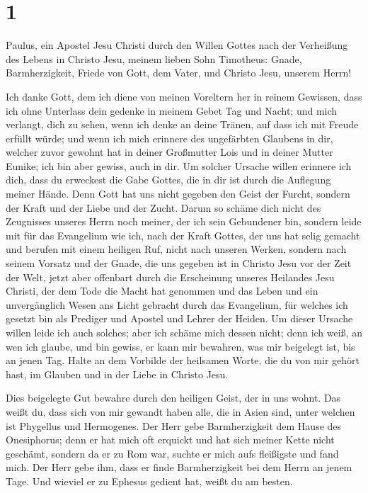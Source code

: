 \hypertarget{section}{%
\section{1}\label{section}}

 Paulus, ein Apostel Jesu Christi durch den Willen Gottes
nach der Verheißung des Lebens in Christo Jesu,  meinem
lieben Sohn Timotheus: Gnade, Barmherzigkeit, Friede von Gott, dem
Vater, und Christo Jesu, unserem Herrn!

 Ich danke Gott, dem ich diene von meinen Voreltern her in
reinem Gewissen, dass ich ohne Unterlass dein gedenke in meinem Gebet
Tag und Nacht;  und mich verlangt, dich zu sehen, wenn ich
denke an deine Tränen, auf dass ich mit Freude erfüllt würde;
 und wenn ich mich erinnere des ungefärbten Glaubens in
dir, welcher zuvor gewohnt hat in deiner Großmutter Lois und in deiner
Mutter Eunike; ich bin aber gewiss, auch in dir.  Um
solcher Ursache willen erinnere ich dich, dass du erweckest die Gabe
Gottes, die in dir ist durch die Auflegung meiner Hände. 
Denn Gott hat uns nicht gegeben den Geist der Furcht, sondern der Kraft
und der Liebe und der Zucht.  Darum so schäme dich nicht
des Zeugnisses unseres Herrn noch meiner, der ich sein Gebundener bin,
sondern leide mit für das Evangelium wie ich, nach der Kraft Gottes,
 der uns hat selig gemacht und berufen mit einem heiligen
Ruf, nicht nach unseren Werken, sondern nach seinem Vorsatz und der
Gnade, die uns gegeben ist in Christo Jesu vor der Zeit der Welt,
 jetzt aber offenbart durch die Erscheinung unseres
Heilandes Jesu Christi, der dem Tode die Macht hat genommen und das
Leben und ein unvergänglich Wesen ans Licht gebracht durch das
Evangelium,  für welches ich gesetzt bin als Prediger und
Apostel und Lehrer der Heiden.  Um dieser Ursache willen
leide ich auch solches; aber ich schäme mich dessen nicht; denn ich
weiß, an wen ich glaube, und bin gewiss, er kann mir bewahren, was mir
beigelegt ist, bis an jenen Tag.  Halte an dem Vorbilde
der heilsamen Worte, die du von mir gehört hast, im Glauben und in der
Liebe in Christo Jesu.

 Dies beigelegte Gut bewahre durch den heiligen Geist,
der in uns wohnt.  Das weißt du, dass sich von mir
gewandt haben alle, die in Asien sind, unter welchen ist Phygellus und
Hermogenes.  Der Herr gebe Barmherzigkeit dem Hause des
Onesiphorus; denn er hat mich oft erquickt und hat sich meiner Kette
nicht geschämt,  sondern da er zu Rom war, suchte er mich
aufs fleißigste und fand mich.  Der Herr gebe ihm, dass
er finde Barmherzigkeit bei dem Herrn an jenem Tage. Und wieviel er zu
Ephesus gedient hat, weißt du am besten.

